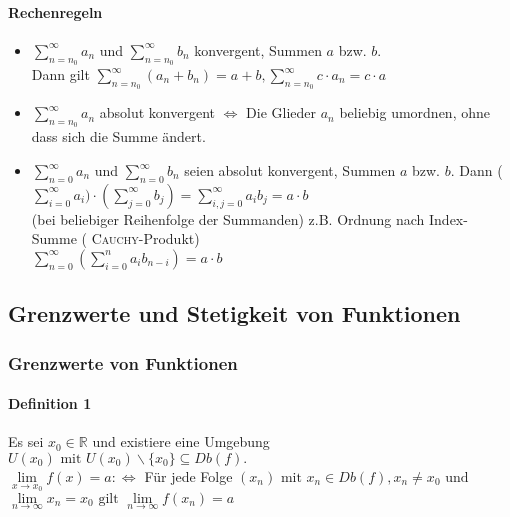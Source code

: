 \documentclass[a4paper]{scrartcl}
\begin{document}
\begin{enumerate}
\begin{enumerate}
\end{enumerate}
\end{enumerate}

\paragraph{Rechenregeln}
\begin{itemize}
\item $\sum\limits_{n=n_0}^{\infty} a_n$ und $\sum\limits_{n=n_0}^{\infty} b_n$ konvergent, Summen $a$ bzw. $b$.\\
Dann gilt $\sum\limits_{n=n_0}^{\infty} (a_n + b_n) = a+b, \sum\limits_{n=n_0}^{\infty} c \cdot a_n = c \cdot a$
\item $\sum\limits_{n=n_0}^{\infty} a_n$ absolut konvergent $\Leftrightarrow$ Die Glieder $a_n$ beliebig umordnen, ohne dass sich die Summe ändert.
\item $\sum\limits_{n=0}^{\infty} a_n$ und $ \sum\limits_{n=0}^{\infty} b_n$ seien absolut konvergent, Summen $a$ bzw. $b$. Dann ( $\sum\limits_{i=0}^{\infty} a_i ) \cdot ( \sum\limits_{j=0}^{\infty} b_j) = \sum\limits_{i,j=0}^{\infty} a_i b_j = a \cdot b$\\
(bei beliebiger Reihenfolge der Summanden)
z.B. Ordnung nach Index-Summe ( \textsc{Cauchy}-Produkt)\\
$\sum\limits_{n=0}^{\infty}(\sum\limits_{i=0}^{n} a_i b_{n-i} ) = a \cdot b$
\end{itemize}

\subsection{Grenzwerte und Stetigkeit von Funktionen}
\subsubsection{Grenzwerte von Funktionen}
\paragraph{Definition 1} Es sei $x_0 \in \mathbb{R}$ und existiere eine Umgebung $U(x_0) \text{ mit } U(x_0) \backslash \{ x_0 \} \subseteq Db(f).$\\
$\lim\limits_{x \to x_0} f(x) = a :\Leftrightarrow$ Für jede Folge $(x_n) \text{ mit } x_n \in Db(f), x_n \neq x_0 \text{  und }$ \\ $\lim\limits_{n \to \infty} x_n = x_0 \text{ gilt } \lim\limits_{n \to \infty} f(x_n) = a$
\end{document}
